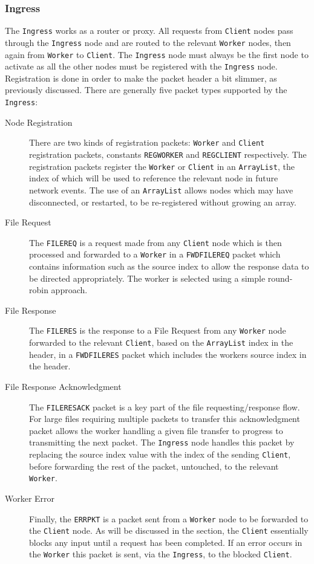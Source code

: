 \documentclass{article}
\newcommand{\code}[1]{\texttt{#1}}
\begin{document}
\subsubsection{Ingress}
\label{subsec:Ingress}
The \code{Ingress} works as a router or proxy. All requests from \code{Client} nodes pass through the \code{Ingress} node and are routed to the relevant \code{Worker} nodes, then again from \code{Worker} to \code{Client}. The \code{Ingress} node must always be the first node to activate as all the other nodes must be registered with the \code{Ingress} node. Registration is done in order to make the packet header a bit slimmer, as previously discussed.
There are generally five packet types supported by the \code{Ingress}:
\begin{description}
	\item[Node Registration] There are two kinds of registration packets: \code{Worker} and \code{Client} registration packets, constants \code{REGWORKER} and \code{REGCLIENT} respectively. The registration packets register the \code{Worker} or \code{Client} in an \code{ArrayList}, the index of which will be used to reference the relevant node in future network events. The use of an \code{ArrayList} allows nodes which may have disconnected, or restarted, to be re-registered without growing an array.
	\item[File Request] The \code{FILEREQ} is a request made from any \code{Client} node which is then processed and forwarded to a \code{Worker} in a \code{FWDFILEREQ} packet which contains information such as the source index to allow the response data to be directed appropriately. The worker is selected using a simple round-robin approach.
	\item[File Response] The \code{FILERES} is the response to a File Request from any \code{Worker} node forwarded to the relevant \code{Client}, based on the \code{ArrayList} index in the header, in a \code{FWDFILERES} packet which includes the workers source index in the header.
	\item[File Response Acknowledgment] The \code{FILERESACK} packet is a key part of the file requesting/response flow. For large files requiring multiple packets to transfer this acknowledgment packet allows the worker handling a given file transfer to progress to transmitting the next packet. The \code{Ingress} node handles this packet by replacing the source index value with the index of the sending \code{Client}, before forwarding the rest of the packet, untouched, to the relevant \code{Worker}.
	\item[Worker Error] Finally, the \code{ERRPKT} is a packet sent from a \code{Worker} node to be forwarded to the \code{Client} node. As will be discussed in the \code{} section, the \code{Client} essentially blocks any input until a request has been completed. If an error occurs in the \code{Worker} this packet is sent, via the \code{Ingress}, to the blocked \code{Client}.
\end{description}
\end{document}
